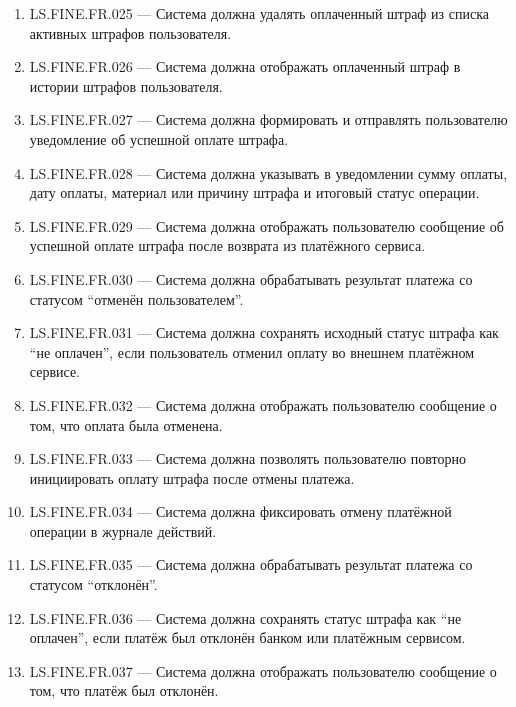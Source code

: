 \documentclass[12pt,a4paper]{article}
\begin{document}
\begin{enumerate}
		\item LS.FINE.FR.025 --- Система должна удалять оплаченный штраф из списка
		активных штрафов пользователя.
		
		\item LS.FINE.FR.026 --- Система должна отображать оплаченный штраф в истории
		штрафов пользователя.
		
		\item LS.FINE.FR.027 --- Система должна формировать и отправлять пользователю
		уведомление об успешной оплате штрафа.
		
		\item LS.FINE.FR.028 --- Система должна указывать в уведомлении сумму оплаты,
		дату оплаты, материал или причину штрафа и итоговый статус операции.
		
		\item LS.FINE.FR.029 --- Система должна отображать пользователю сообщение об
		успешной оплате штрафа после возврата из платёжного сервиса.
		
		\item LS.FINE.FR.030 --- Система должна обрабатывать результат платежа со статусом
		``отменён пользователем''.
		
		\item LS.FINE.FR.031 --- Система должна сохранять исходный статус штрафа как
		``не оплачен'', если пользователь отменил оплату во внешнем платёжном сервисе.
		
		\item LS.FINE.FR.032 --- Система должна отображать пользователю сообщение о том,
		что оплата была отменена.
		
		\item LS.FINE.FR.033 --- Система должна позволять пользователю повторно инициировать
		оплату штрафа после отмены платежа.
		
		\item LS.FINE.FR.034 --- Система должна фиксировать отмену платёжной операции
		в журнале действий.
		
		\item LS.FINE.FR.035 --- Система должна обрабатывать результат платежа со статусом
		``отклонён''.
		
		\item LS.FINE.FR.036 --- Система должна сохранять статус штрафа как ``не оплачен'',
		если платёж был отклонён банком или платёжным сервисом.
		
		\item LS.FINE.FR.037 --- Система должна отображать пользователю сообщение о том,
		что платёж был отклонён.
		

\end{enumerate}
\end{document}
